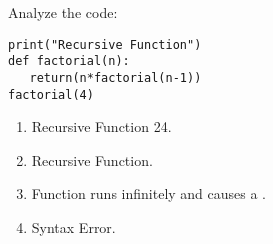 \question
Analyze the code:

\begin{lstlisting}
print("Recursive Function") 
def factorial(n): 
   return(n*factorial(n-1))  
factorial(4)
\end{lstlisting}
\begin{enumerate}
\item Recursive Function 24.
\item Recursive Function.
\item Function runs infinitely and causes a \lstinline@StackOverflowError@.
\item Syntax Error.
\end{enumerate}

